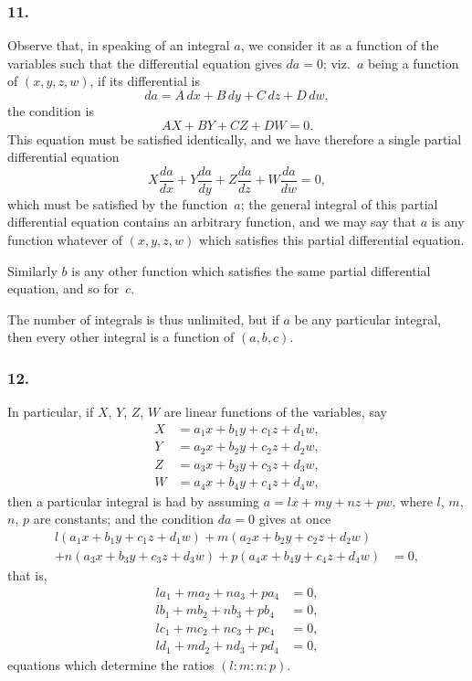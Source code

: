 \documentclass[11pt,a4paper]{book}
\begin{document}
\subsubsection*{11.}

Observe that, in speaking of an integral $a$, we consider it as a function of the variables such that the differential equation gives $da = 0$; viz.~$a$ being a function of $(x, y, z, w)$, if its differential is
\[
da = A\,dx + B\,dy + C\,dz + D\,dw,
\]
the condition is
\[
AX + BY + CZ + DW = 0.
\]
This equation must be satisfied identically, and we have therefore a single partial differential equation
\[
X\frac{da}{dx} + Y\frac{da}{dy} + Z\frac{da}{dz} + W\frac{da}{dw} = 0,
\]
which must be satisfied by the function~$a$; the general integral of this partial differential equation contains an arbitrary function, and we may say that $a$ is any function whatever of $(x, y, z, w)$ which satisfies this partial differential equation.

Similarly $b$ is any other function which satisfies the same partial differential equation, and so for~$c$.

The number of integrals is thus unlimited, but if $a$ be any particular integral, then every other integral is a function of $(a, b, c)$.

\subsubsection*{12.}

In particular, if $X$, $Y$, $Z$, $W$ are linear functions of the variables, say
\begin{align*}
X &= a_{1}x + b_{1}y + c_{1}z + d_{1}w, \\
Y &= a_{2}x + b_{2}y + c_{2}z + d_{2}w, \\
Z &= a_{3}x + b_{3}y + c_{3}z + d_{3}w, \\
W &= a_{4}x + b_{4}y + c_{4}z + d_{4}w,
\end{align*}
then a particular integral is had by assuming $a = lx + my + nz + pw$, where $l$, $m$, $n$, $p$ are constants; and the condition $da = 0$ gives at once
\begin{align*}
l(a_{1}x + b_{1}y + c_{1}z + d_{1}w) + m(a_{2}x + b_{2}y + c_{2}z + d_{2}w) \\
+ n(a_{3}x + b_{3}y + c_{3}z + d_{3}w) + p(a_{4}x + b_{4}y + c_{4}z + d_{4}w) &= 0,
\end{align*}
that is,
\begin{align*}
l a_{1} + m a_{2} + n a_{3} + p a_{4} &= 0, \\
l b_{1} + m b_{2} + n b_{3} + p b_{4} &= 0, \\
l c_{1} + m c_{2} + n c_{3} + p c_{4} &= 0, \\
l d_{1} + m d_{2} + n d_{3} + p d_{4} &= 0,
\end{align*}
equations which determine the ratios $(l : m : n : p)$.
\end{document}
